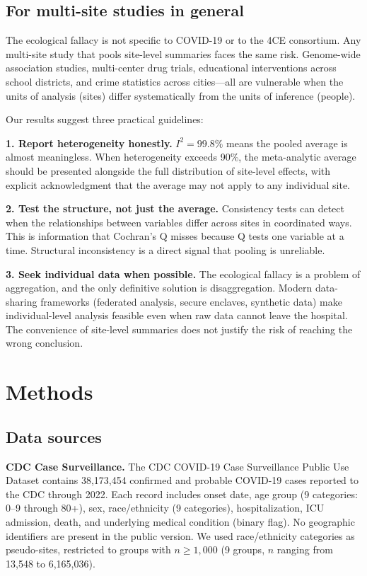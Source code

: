 \documentclass{article}
\begin{document}
\subsection{For multi-site studies in general}

The ecological fallacy is not specific to COVID-19 or to the 4CE consortium.
Any multi-site study that pools site-level summaries faces the same risk.
Genome-wide association studies, multi-center drug trials, educational
interventions across school districts, and crime statistics across
cities---all are vulnerable when the units of analysis (sites) differ
systematically from the units of inference (people).

Our results suggest three practical guidelines:

\textbf{1. Report heterogeneity honestly.}  $I^2 = 99.8\%$ means the pooled
average is almost meaningless.  When heterogeneity exceeds 90\%, the meta-analytic
average should be presented alongside the full distribution of site-level
effects, with explicit acknowledgment that the average may not apply to any
individual site.

\textbf{2. Test the structure, not just the average.}  Consistency tests can
detect when the relationships between variables differ across sites in
coordinated ways.  This is information that Cochran's Q misses because Q
tests one variable at a time.  Structural inconsistency is a direct signal
that pooling is unreliable.

\textbf{3. Seek individual data when possible.}  The ecological fallacy is
a problem of aggregation, and the only definitive solution is disaggregation.
Modern data-sharing frameworks (federated analysis, secure enclaves, synthetic
data) make individual-level analysis feasible even when raw data cannot leave
the hospital.  The convenience of site-level summaries does not justify the
risk of reaching the wrong conclusion.


\section{Methods}

\subsection{Data sources}

\textbf{CDC Case Surveillance.}  The CDC COVID-19 Case Surveillance Public
Use Dataset contains 38,173,454 confirmed and probable COVID-19 cases reported
to the CDC through 2022.  Each record includes onset date, age group (9
categories: 0--9 through 80+), sex, race/ethnicity (9 categories),
hospitalization, ICU admission, death, and underlying medical condition (binary
flag).  No geographic identifiers are present in the public version.  We used
race/ethnicity categories as pseudo-sites, restricted to groups with $n \geq
1{,}000$ (9 groups, $n$ ranging from 13,548 to 6,165,036).
\end{document}
